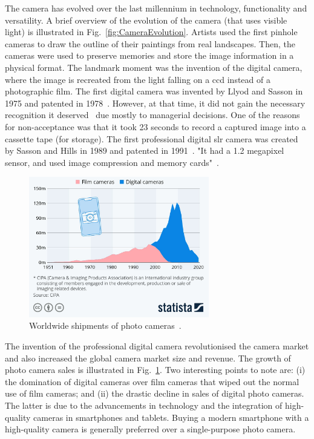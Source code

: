The camera has evolved over the last millennium in technology, functionality and versatility. 
A brief overview of the evolution of the camera (that uses visible light) is illustrated in Fig.~\ref{fig:CameraEvolution}.
Artists used the first pinhole cameras to draw the outline of their paintings from real landscapes.
Then, the cameras were used to preserve memories and store the image information in a physical format.
The landmark moment was the invention of the digital camera, where the image is recreated from the light falling on a \gls{ccd} instead of a photographic film.
The first digital camera was invented by Llyod and Sasson in 1975 and patented in 1978~\cite{lloyd1978electronic}. 
However, at that time, it did not gain the necessary recognition it deserved~\cite{estrin2015Kodak} due mostly to managerial decisions.
One of the reasons for non-acceptance was that it took 23 seconds to record a captured image into a cassette tape (for storage).
The first professional digital \gls{slr} camera was created by Sasson and Hills in 1989 and patented in 1991~\cite{sasson1991electronic}. 
"It had a 1.2 megapixel sensor, and used image compression and memory cards"~\cite{estrin2015Kodak}.

\begin{figure}[ht]
    \centering
    \includegraphics[width=0.7\textwidth]{Figures/camera2.jpeg}
    \caption{Worldwide shipments of photo cameras~\cite{statista2021camera}.}
    \label{fig:CameraSales}
\end{figure}

The invention of the professional digital camera revolutionised the camera market and also increased the global camera market size and revenue. 
The growth of photo camera sales is illustrated in Fig.~\ref{fig:CameraSales}.
Two interesting points to note are: (i) the domination of digital cameras over film cameras that wiped out the normal use of film cameras; and (ii) the drastic decline in sales of digital photo cameras.
The latter is due to the advancements in technology and the integration of high-quality cameras in smartphones and tablets. 
Buying a modern smartphone with a high-quality camera is generally preferred over a single-purpose photo camera. 

